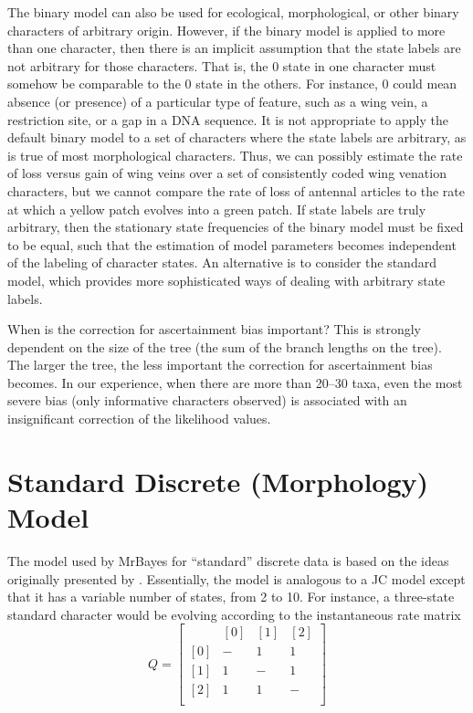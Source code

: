 \documentclass[12pt]{book}
\begin{document}
The binary model can also be used for ecological, morphological, or other binary characters of
arbitrary origin. However, if the binary model is applied to more than one character, then there is
an implicit assumption that the state labels are not arbitrary for those characters. That is, the 0
state in one character must somehow be comparable to the 0 state in the others. For instance, 0
could mean absence (or presence) of a particular type of feature, such as a wing vein, a
restriction site, or a gap in a DNA sequence. It is not appropriate to apply the default binary
model to a set of characters where the state labels are arbitrary, as is true of most morphological
characters. Thus, we can possibly estimate the rate of loss versus gain of wing veins over a set of
consistently coded wing venation characters, but we cannot compare the rate of loss of antennal
articles to the rate at which a yellow patch evolves into a green patch. If state labels are truly
arbitrary, then the stationary state frequencies of the binary model must be fixed to be equal,
such that the estimation of model parameters becomes independent of the labeling of character
states. An alternative is to consider the standard model, which provides more sophisticated ways
of dealing with arbitrary state labels.

When is the correction for ascertainment bias important? This is strongly dependent on the size of
the tree (the sum of the branch lengths on the tree). The larger the tree, the less important the
correction for ascertainment bias becomes. In our experience, when there are more than 20--30 taxa,
even the most severe bias (only informative characters observed) is associated with an
insignificant correction of the likelihood values.

\section{Standard Discrete (Morphology) Model}

The model used by MrBayes for ``standard'' discrete data is based on the ideas originally presented
by \citet{lewis01}. Essentially, the model is analogous to a JC model except that it has a variable
number of states, from 2 to 10. For instance, a three-state standard character would be evolving
according to the instantaneous rate matrix
\[
Q=\begin{bmatrix}
    & [0] & [1] & [2]\\
 [0]& - & 1 & 1\\
 [1]& 1& -  & 1\\
 [2]& 1& 1  & -\\
\end{bmatrix}
\]
\end{document}
